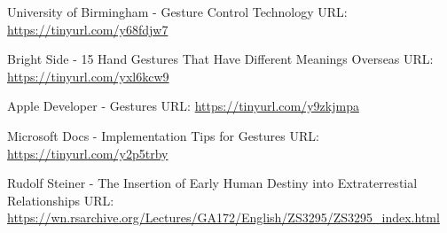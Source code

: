 \documentclass{article}
\begin{document}
\begin{thebibliography}{00}
 University of Birmingham - Gesture Control Technology
\newline
URL: \url{https://tinyurl.com/y68fdjw7}

 Bright Side - 15 Hand Gestures That Have Different Meanings Overseas
\newline
URL: \url{https://tinyurl.com/yxl6kcw9}

 Apple Developer - Gestures
\newline
URL: \url{https://tinyurl.com/y9zkjmpa}

 Microsoft Docs - Implementation Tips for Gestures
\newline
URL: \url{https://tinyurl.com/y2p5trby}

 Rudolf Steiner - The Insertion of Early Human Destiny into Extraterrestial Relationships
\newline
URL: \url{https://wn.rsarchive.org/Lectures/GA172/English/ZS3295/ZS3295_index.html} 

\end{thebibliography}

\end{document}
